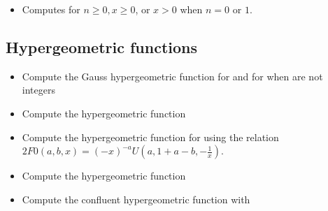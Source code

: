 \begin{itemize}
\item {}
  \sshortdescribe   Computes  for  $ n\geq 0, x \geq 0$, or $x>0$
  when $n=0$ or $1$.
\end{itemize}

\subsection{Hypergeometric functions}

\begin{itemize}
\item {}
  \sshortdescribe Compute the Gauss hypergeometric function 
  for  and for  when  are
  not integers
\item {}
  \sshortdescribe Compute the hypergeometric function 
\item {}
  \sshortdescribe Compute the hypergeometric function   for
   using the relation $2F0 (a,b,x) = (-x)^{-a} U(a,1+a-b,-\frac{1}{x})$.
\item {}
  \sshortdescribe Compute the hypergeometric function 
\item {}
  \sshortdescribe Compute the confluent hypergeometric function 
  with 
\end{itemize}


